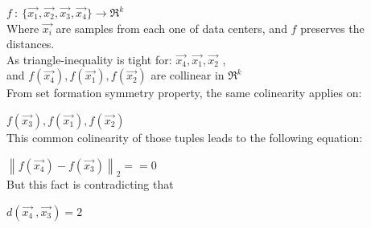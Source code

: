 	$f \: : \: \{  \overrightarrow{x_1}, \overrightarrow{x_2} , \overrightarrow{x_3} , \overrightarrow{x_4}\} \rightarrow \Re^k$ \\
		
	Where $\overrightarrow{x_i}$ are samples from each one of data centers, and $f$ preserves the distances. \\
	
    As triangle-inequality is tight for: $\overrightarrow{x_4} , \overrightarrow{x_1} , \overrightarrow{x_2}$ ,\\
	
	and $f(\overrightarrow{x_4}) ,f(\overrightarrow{x_1}) ,f(\overrightarrow{x_2})$ are collinear in $\Re^k$ \\ 
	
	From set formation symmetry property, the same colinearity applies on:
		
	$f(\overrightarrow{x_3}) ,f(\overrightarrow{x_1}) ,f(\overrightarrow{x_2})$ \\ 
	
	This common colinearity of those tuples leads to the following equation:
	
	$\left \| f(\overrightarrow{x_4}) - f(\overrightarrow{x_3})  \right \|_2 == 0$ \\
	
	But this fact is contradicting that 
	
	$ d(\overrightarrow{x_4}\ , \overrightarrow{x_3}) = 2 $
	
	
	





	




